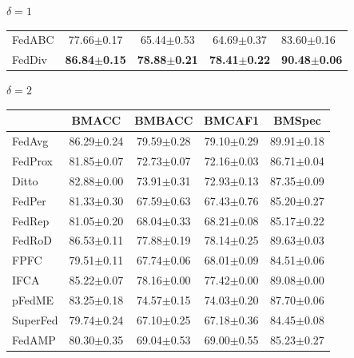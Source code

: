 \documentclass[journal]{IEEEtran}
\begin{document}
\begin{table}
\begin{subtable}[]{$\delta=1$}
\begin{tabular}{@{}lcccl@{}}
			FedABC   & 77.66$\pm$0.17          & 65.44$\pm$0.53          & 64.69$\pm$0.37          & 83.60$\pm$0.16             \\
			FedDiv   & \textbf{86.84$\pm$0.15} & \textbf{78.88$\pm$0.21} & \textbf{78.41$\pm$0.22} & \textbf{90.48$\pm$0.06}    \\ \bottomrule
		\end{tabular}
	\end{subtable}
	\centering
	\begin{subtable}[]{$\delta=2$}
		\begin{tabular}{@{}lcccl@{}}
			\toprule
			& BMACC                   & BMBACC                  & BMCAF1                  & \multicolumn{1}{c}{BMSpec} \\ \midrule
			FedAvg          & 86.29$\pm$0.24          & 79.59$\pm$0.28          & 79.10$\pm$0.29          & 89.91$\pm$0.18          \\
			FedProx         & 81.85$\pm$0.07          & 72.73$\pm$0.07          & 72.16$\pm$0.03          & 86.71$\pm$0.04          \\
			Ditto           & 82.88$\pm$0.00          & 73.91$\pm$0.31          & 72.93$\pm$0.13          & 87.35$\pm$0.09          \\
			FedPer          & 81.33$\pm$0.30          & 67.59$\pm$0.63          & 67.43$\pm$0.76          & 85.20$\pm$0.27          \\
			FedRep          & 81.05$\pm$0.20          & 68.04$\pm$0.33          & 68.21$\pm$0.08          & 85.17$\pm$0.22          \\
			FedRoD          & 86.53$\pm$0.11          & 77.88$\pm$0.19          & 78.14$\pm$0.25          & 89.63$\pm$0.03          \\
			FPFC            & 79.51$\pm$0.11          & 67.74$\pm$0.06          & 68.01$\pm$0.09          & 84.51$\pm$0.06          \\
			IFCA            & 85.22$\pm$0.07          & 78.16$\pm$0.00          & 77.42$\pm$0.00          & 89.08$\pm$0.00          \\
			pFedME          & 83.25$\pm$0.18          & 74.57$\pm$0.15          & 74.03$\pm$0.20          & 87.70$\pm$0.06          \\
			SuperFed        & 79.74$\pm$0.24          & 67.10$\pm$0.25          & 67.18$\pm$0.36          & 84.45$\pm$0.08          \\
			FedAMP          & 80.30$\pm$0.35          & 69.04$\pm$0.53          & 69.00$\pm$0.55          & 85.23$\pm$0.27          \\

\end{tabular}
\end{subtable}
\end{table}
\end{document}
